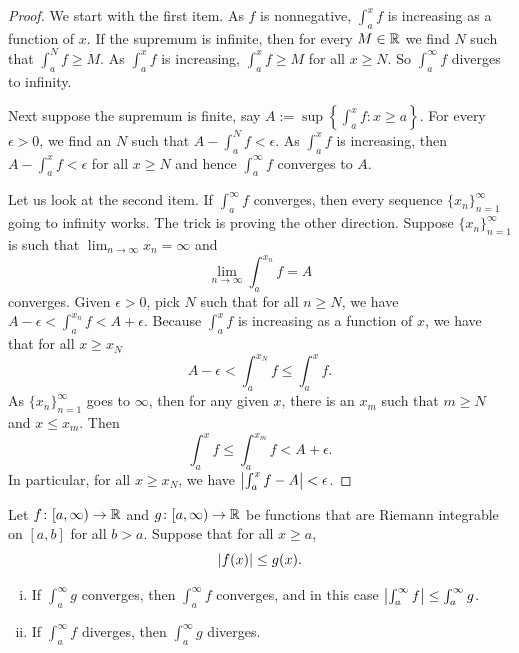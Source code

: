 \begin{proof}
We start with the first item.
As $f$ is nonnegative,
$\int_a^x f$ is increasing as a function of $x$.
If the supremum is infinite, then for every $M \in {\mathbb{R}}$
we find $N$ such that $\int_a^N f \geq M$.  As $\int_a^x f$
is increasing, $\int_a^x f \geq M$ for all $x \geq N$.  So
$\int_a^\infty f$ diverges to infinity.

Next suppose the supremum is finite, say
$A := \sup \left\{ \int_a^x f : x \geq a \right\}$.
For every $\epsilon > 0$, we find an $N$ such that
$A - \int_a^N f < \epsilon$.  As $\int_a^x f$ is increasing,
then
$A - \int_a^x f < \epsilon$ for all $x \geq N$ and hence
$\int_a^\infty f$ converges to $A$.

Let us look at the second item.
If $\int_a^\infty f$ converges, then every sequence $\{ x_n \}_{n=1}^\infty$ going to
infinity works.  The trick is
proving the other direction.  Suppose $\{ x_n \}_{n=1}^\infty$ is such that
$\lim_{n\to\infty} x_n = \infty$ and
\begin{equation*}
\lim_{n\to\infty} \int_a^{x_n} f = A
\end{equation*}
converges.  Given $\epsilon > 0$, pick $N$ such that for
all $n \geq N$, we have
$A - \epsilon < \int_a^{x_n} f < A + \epsilon$.
Because $\int_a^x f$ is increasing as a function of $x$, we have that for all
$x \geq x_N$
\begin{equation*}
A - \epsilon < \int_a^{x_N} f \leq \int_a^x f .
\end{equation*}
As $\{ x_n \}_{n=1}^\infty$ goes to $\infty$, then for any given
$x$, there is an $x_m$ such that $m \geq N$ and $x \leq x_m$.  Then
\begin{equation*}
\int_a^{x} f \leq \int_a^{x_m} f < A + \epsilon .
\end{equation*}
In particular, for all $x \geq x_N$, we have
$\left\lvert {\int_a^{x} f - A} \right\rvert < \epsilon$.
\end{proof}

\begin{prop}
Let
$f \colon [a,\infty) \to {\mathbb{R}}$ and
$g \colon [a,\infty) \to {\mathbb{R}}$ be functions
that are Riemann integrable on $[a,b]$ for all $b > a$.   Suppose
that for all $x \geq a$,
\begin{equation*}
\left\lvert {f(x)} \right\rvert \leq g(x) .
\end{equation*}
\begin{enumerate}[(i)]
\item If $\int_a^\infty g$ converges, then $\int_a^\infty f$ converges,
and in this case 
$\left\lvert {\int_a^\infty f} \right\rvert \leq \int_a^\infty g$.
\item If $\int_a^\infty f$ diverges, then $\int_a^\infty g$ diverges.
\end{enumerate}
\end{prop}

